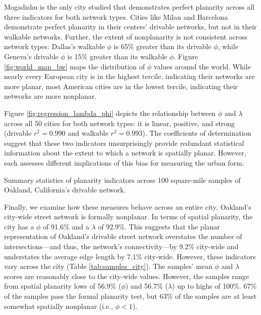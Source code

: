 \documentclass[Afour,sageh,times]{sagej}
\begin{document}
Mogadishu is the only city studied that demonstrates perfect planarity across all three indicators for both network types. Cities like Milan and Barcelona demonstrate perfect planarity in their centers' drivable networks, but not in their walkable networks. Further, the extent of nonplanarity is not consistent across network types: Dallas's walkable $\phi$ is 65\% greater than its drivable $\phi$, while Geneva's drivable $\phi$ is 15\% greater than its walkable $\phi$. Figure \ref{fig:world_map_bw} maps the distribution of $\phi$ values around the world. While nearly every European city is in the highest tercile, indicating their networks are more planar, most American cities are in the lowest tercile, indicating their networks are more nonplanar.

Figure \ref{fig:regression_lambda_phi} depicts the relationship between $\phi$ and $\lambda$ across all 50 cities for both network types: it is linear, positive, and strong (drivable $r^2=0.990$ and walkable $r^2=0.993$). The coefficients of determination suggest that these two indicators unsurprisingly provide redundant statistical information about the extent to which a network is spatially planar. However, each assesses different implications of this bias for measuring the urban form.

\begin{table}[htbp]
	\centering
	\caption{Summary statistics of planarity indicators across 100 square-mile samples of Oakland, California's drivable network.}
	\label{tab:samples_city}
	
\end{table}

Finally, we examine how these measures behave across an entire city. Oakland's city-wide street network is formally nonplanar. In terms of spatial planarity, the city has a $\phi$ of 91.6\% and a $\lambda$ of 92.9\%. This suggests that the planar representation of Oakland's drivable street network overstates the number of intersections---and thus, the network's connectivity---by 9.2\% city-wide and understates the average edge length by 7.1\% city-wide. However, these indicators vary across the city (Table \ref{tab:samples_city}). The samples' mean $\phi$ and $\lambda$ scores are reasonably close to the city-wide values. However, the samples range from spatial planarity lows of 56.9\% ($\phi$) and 56.7\% ($\lambda$) up to highs of 100\%. 67\% of the samples pass the formal planarity test, but 63\% of the samples are at least somewhat spatially nonplanar (i.e., $\phi < 1$).
\end{document}
